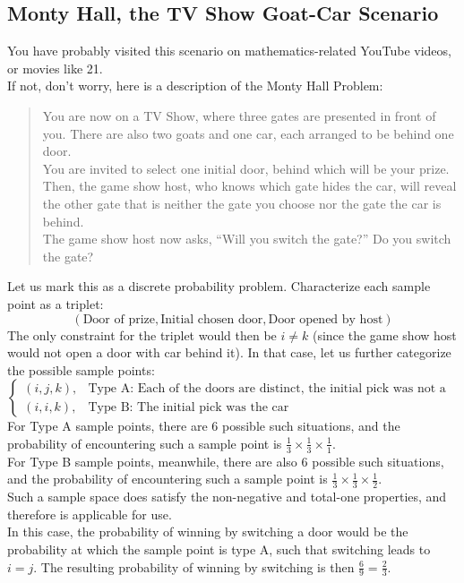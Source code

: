 \subsection{Monty Hall, the TV Show Goat-Car Scenario}
You have probably visited this scenario on mathematics-related YouTube videos, or movies like 21. \\
If not, don't worry, here is a description of the Monty Hall Problem:
\begin{quote}
    You are now on a TV Show, where three gates are presented in front of you. There are also two goats and one car, each arranged to be behind one door. \\
    You are invited to select one initial door, behind which will be your prize. \\
    Then, the game show host, who knows which gate hides the car, will reveal the other gate that is neither the gate you choose nor the gate the car is behind. \\
    The game show host now asks, ``Will you switch the gate?'' Do you switch the gate?
\end{quote}
Let us mark this as a discrete probability problem. Characterize each sample point as a triplet:
\[(\text{Door of prize}, \text{Initial chosen door}, \text{Door opened by host})\]
The only constraint for the triplet would then be $i \neq k$ (since the game show host would not open a door with car behind it).
In that case, let us further categorize the possible sample points:
\[
    \begin{cases}
        (i, j, k), &\text{Type A: Each of the doors are distinct, the initial pick was not a car} \\
        (i, i, k), &\text{Type B: The initial pick was the car}
    \end{cases}
\]
For Type A sample points, there are $6$ possible such situations, and the probability of encountering such a sample point is $\frac{1}{3} \times \frac{1}{3} \times \frac{1}{1}$. \\
For Type B sample points, meanwhile, there are also $6$ possible such situations, and the probability of encountering such a sample point is $\frac{1}{3} \times \frac{1}{3} \times \frac{1}{2}$. \\
Such a sample space does satisfy the non-negative and total-one properties, and therefore is applicable for use. \\
In this case, the probability of winning by switching a door would be the probability at which the sample point is type A, such that switching leads to $i = j$. The resulting probability of winning by switching is then $\frac{6}{9} = \frac{2}{3}$.

